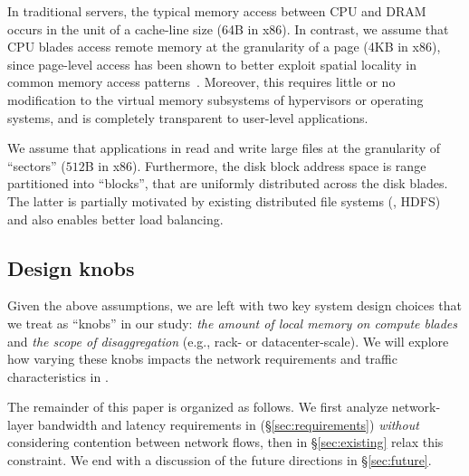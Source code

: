 In traditional servers, the typical memory access between CPU and DRAM occurs in the unit of a cache-line size (64B in x86). In contrast, we assume that CPU blades access remote memory at the granularity of a page (4KB in x86), since page-level access has been shown to better exploit spatial locality in common memory access patterns~\cite{ddcHwDesign1}. Moreover, this requires little or no modification to the virtual memory subsystems of hypervisors or operating systems, and is completely transparent to user-level applications. 


We assume that applications in \dis read and write large files at the granularity of ``sectors'' ($512$B in x86). Furthermore, the disk block address space is range partitioned into ``blocks'', that are uniformly distributed across the disk blades. The latter is partially motivated by existing distributed file systems (\eg, HDFS) and also enables better load balancing. %
%
\subsection{Design knobs}
\label{ssec:knobs}
Given the above assumptions, we are left with two key system design choices that we treat as ``knobs'' in our study: {\em the amount of local memory on compute blades} and  {\em the scope of disaggregation} (e.g., rack- or datacenter-scale). We will explore how varying these knobs impacts the network requirements and traffic characteristics in \dis. 

The remainder of this paper is organized as follows. We first analyze network-layer bandwidth and latency requirements in \dis(\S\ref{sec:requirements}) \emph{without} considering contention between network flows, then in \S\ref{sec:existing} relax this constraint. We end with a discussion of the future directions in \S\ref{sec:future}.